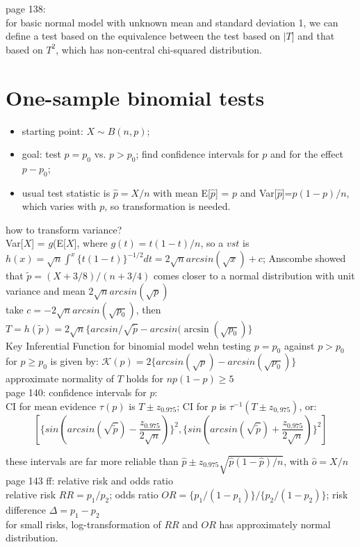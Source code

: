 page 138:\\
for basic normal model with unknown mean and standard deviation 1, we can define a test based on the equivalence between the test based on $|T]$ and that based on $T^2$, which has non-central chi-squared distribution.

\section{One-sample binomial tests}
\begin{itemize}
    \item starting point: $X\sim B(n,p)$;
    \item goal: test $p=p_0$ vs. $p>p_0$; find confidence intervals for $p$ and for the effect $p-p_0$;
    \item usual test statistic is $\hat{p}=X/n$ with mean E[$\hat{p}$] = $p$ and Var[$\hat{p}$]=$p(1-p)/n$, which varies with $p$, so transformation is needed.
\end{itemize}

how to transform variance?\\
Var[$X$] = $g$(E[$X$], where $g(t)=t(1-t)/n$, so a $vst$ is $h(x)=\sqrt{n}\int^x \{t(1-t)\}^{-1/2}dt=2\sqrt{n}arcsin(\sqrt{x})+c$; Anscombe showed that $\tilde{p}=(X+3/8)/(n+3/4)$ comes closer to a normal distribution with unit variance and mean $2\sqrt{n}arcsin(\sqrt{p})$\\
take $c=-2\sqrt{n}arcsin(\sqrt{p_0})$, then $T=h(\tilde{p})=2\sqrt{n}\{arcsin/\sqrt{\tilde{p}}-arcsin(\arcsin(\sqrt{p_0})\}$\\
Key Inferential Function for binomial model wehn testing $p=p_0$ against $p>p_0$ for $p\geq p_0$ is given by: $\mathcal{K}(p)=2\{arcsin(\sqrt{p})-arcsin(\sqrt{p_0})\}$\\

approximate normality of $T$ holds for $np(1-p)\geq 5$\\

page 140: confidence intervals for $p$:\\
CI for mean evidence $\tau(p)$ is $T \pm z_{0.975}$; CI for $p$ is $\tau^{-1}(T \pm z_{0,975})$, or: $$[\{sin(arcsin(\sqrt{\tilde{p}})-\frac{z_{0.975}}{2\sqrt{n}})\}^2, \{sin(arcsin(\sqrt{\tilde{p}})+\frac{z_{0.975}}{2\sqrt{n}})\}^2]$$

these intervals are far more reliable than $\hat{p}\pm z_{0.975} \sqrt{\hat{p}(1-\hat{p})/n}$, with $\hat{o}=X/n$\\

page 143 ff: relative risk and odds ratio\\
relative risk $RR = p_1/p_2$; odds ratio $OR = \{p_1/(1-p_1)\}/\{p_2/(1-p_2)\}$; risk difference $\Delta = p_1-p_2$\\
for small risks, log-transformation of $RR$ and $OR$ has approximately normal distribution.\\

